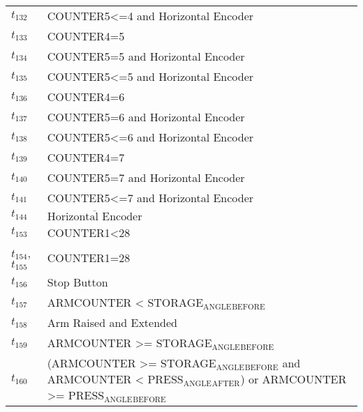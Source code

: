 \begin{longtable}{M{5cm}M{10cm}}
\hyperlink{completeNet:t132}{\hypertarget{completeTable:t132}{$t_{132}$}} & COUNTER5<=4 and Horizontal Encoder\\
\hyperlink{completeNet:t133}{\hypertarget{completeTable:t133}{$t_{133}$}} & COUNTER4=5\\
\hyperlink{completeNet:t134}{\hypertarget{completeTable:t134}{$t_{134}$}} & COUNTER5=5 and Horizontal Encoder\\
\hyperlink{completeNet:t135}{\hypertarget{completeTable:t135}{$t_{135}$}} & COUNTER5<=5 and Horizontal Encoder\\
\hyperlink{completeNet:t136}{\hypertarget{completeTable:t136}{$t_{136}$}} & COUNTER4=6\\
\hyperlink{completeNet:t137}{\hypertarget{completeTable:t137}{$t_{137}$}} & COUNTER5=6 and Horizontal Encoder\\
\hyperlink{completeNet:t138}{\hypertarget{completeTable:t138}{$t_{138}$}} & COUNTER5<=6 and Horizontal Encoder\\
\hyperlink{completeNet:t139}{\hypertarget{completeTable:t139}{$t_{139}$}} & COUNTER4=7\\
\hyperlink{completeNet:t140}{\hypertarget{completeTable:t140}{$t_{140}$}} & COUNTER5=7 and Horizontal Encoder\\
\hyperlink{completeNet:t141}{\hypertarget{completeTable:t141}{$t_{141}$}} & COUNTER5<=7 and Horizontal Encoder\\
\hyperlink{completeNet:t144}{\hypertarget{completeTable:t144}{$t_{144}$}} & \(\overline{\mbox{Horizontal Encoder}}\)\\
\hyperlink{completeNet:t153}{\hypertarget{completeTable:t153}{$t_{153}$}} & COUNTER1<28\\
\hyperlink{completeNet:t154}{\hypertarget{completeTable:t154}{$t_{154}$}}, \hyperlink{completeNet:t155}{\hypertarget{completeTable:t155}{$t_{155}$}} & COUNTER1=28\\
\hyperlink{completeNet:t156}{\hypertarget{completeTable:t156}{$t_{156}$}} & Stop Button\\
\hyperlink{completeNet:t157}{\hypertarget{completeTable:t157}{$t_{157}$}} & ARMCOUNTER < STORAGE\(_{\text{ANGLE}}\)\(_{\text{BEFORE}}\)\\
\hyperlink{completeNet:t158}{\hypertarget{completeTable:t158}{$t_{158}$}} & Arm Raised and Extended\\
\hyperlink{completeNet:t159}{\hypertarget{completeTable:t159}{$t_{159}$}} & ARMCOUNTER >= STORAGE\(_{\text{ANGLE}}\)\(_{\text{BEFORE}}\)\\
\hyperlink{completeNet:t160}{\hypertarget{completeTable:t160}{$t_{160}$}} & (ARMCOUNTER >= STORAGE\(_{\text{ANGLE}}\)\(_{\text{BEFORE}}\) and ARMCOUNTER < PRESS\(_{\text{ANGLE}}\)\(_{\text{AFTER}}\)) or ARMCOUNTER >= PRESS\(_{\text{ANGLE}}\)\(_{\text{BEFORE}}\)\\

\end{longtable}
